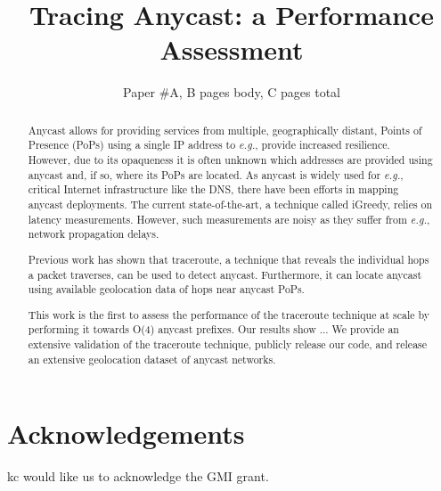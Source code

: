 \documentclass[10pt,sigconf,letterpaper]{acmart}
\begin{document}
 \pagestyle{plain}
  
 \title{Tracing Anycast: a Performance Assessment}

 \newif\ifisanon

\iftrue
\newcommand{\raf}[1]{\textcolor{violet}{\noindent[Raf: #1]}}
\else
\newcommand{\raf}[1]{}
\fi
 
\newcommand{\ie}{\textit{i.e.}}
\newcommand{\etc}{\textit{etc.}}
\newcommand{\eg}{\textit{e.g.}}
 
\isanontrue

\ifisanon

\author{Paper \#A, B pages body, C pages total}
\else 
\author{blaat
}

\fi

\def \manycasttwo  {MAnycast\textsuperscript{2}\xspace}
\def \manycast  {MAnycastR\xspace}

\begin{abstract}
Anycast allows for providing services from multiple, geographically distant, Points of Presence (PoPs) using a single IP address to \eg, provide increased resilience.
However, due to its opaqueness it is often unknown which addresses are provided using anycast and, if so, where its PoPs are located.
As anycast is widely used for \eg, critical Internet infrastructure like the DNS, there have been efforts in mapping anycast deployments.
The current state-of-the-art, a technique called iGreedy, relies on latency measurements. %
However, such measurements are noisy as they suffer from \eg, network propagation delays.

Previous work has shown that traceroute, a technique that reveals the individual hops a packet traverses, can be used to detect anycast. %
Furthermore, it can locate anycast using available geolocation data of hops near anycast PoPs. 

This work is the first to assess the performance of the traceroute technique at scale by performing it towards O(4) anycast prefixes.
Our results show ...
We provide an extensive validation of the traceroute technique, publicly release our code, and release an extensive geolocation dataset of anycast networks.

\end{abstract}

\maketitle











\section{Acknowledgements}
kc would like us to acknowledge the GMI grant.





%
\end{document}
